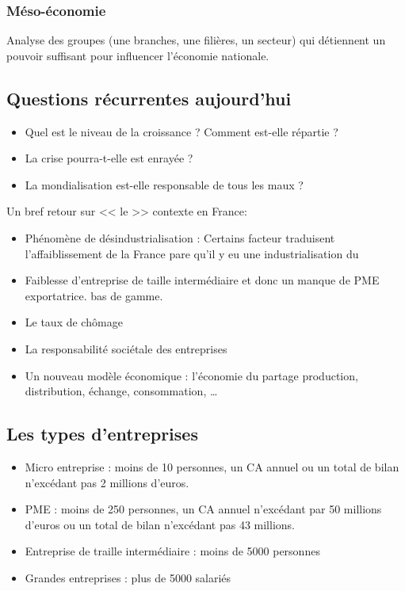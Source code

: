 	\subsubsection{Méso-économie}
	Analyse des groupes (une branches, une filières, un secteur) qui détiennent un pouvoir suffisant pour influencer l'économie nationale.

	\subsection{Questions récurrentes aujourd'hui}
	\begin{itemize}
		\item Quel est le niveau de la croissance ? Comment est-elle répartie ? 
		\item La crise pourra-t-elle est enrayée ? 
		\item La mondialisation est-elle responsable de tous les maux ? 
	\end{itemize}

	Un bref retour sur << le >> contexte en France:
	\begin{itemize}
		\item Phénomène de désindustrialisation : Certains facteur traduisent l'affaiblissement de la France pare qu'il y  eu une industrialisation du
		\item Faiblesse d'entreprise de taille intermédiaire et donc un manque de PME exportatrice.  bas de gamme.
		\item Le taux de chômage
		\item La responsabilité sociétale des entreprises
		\item Un nouveau modèle économique : l'économie du partage  production, distribution, échange, consommation, \ldots
	\end{itemize}

	\subsection{Les types d'entreprises}
	\begin{itemize}
		\item Micro entreprise : moins de 10 personnes, un CA annuel ou un total de bilan n'excédant pas 2 millions d'euros.
		\item PME : moins de 250 personnes, un CA annuel n'excédant par 50 millions d'euros ou un total de bilan n'excédant pas 43 millions.
		\item Entreprise de traille intermédiaire : moins de 5000 personnes
		\item Grandes entreprises : plus de 5000 salariés
	\end{itemize}

